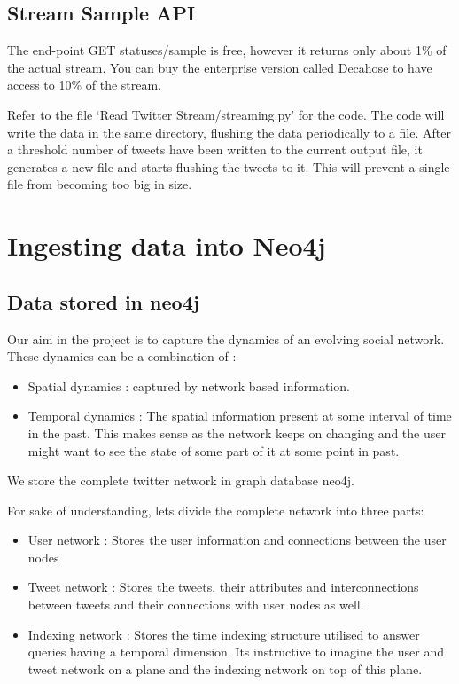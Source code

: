 \documentclass[letterpaper,10pt,english]{sphinxmanual}
\begin{document}
\section{Stream Sample API}
\label{\detokenize{twitter_stream:stream-sample-api}}
The end-point GET statuses/sample is free, however it returns only about 1\% of the actual stream. You can buy the enterprise version called Decahose to have access to 10\% of the stream.

Refer to the file ‘Read Twitter Stream/streaming.py’ for the code. The code will write the data in the same directory, flushing the data periodically to a file. After a threshold number of tweets have been written to the current output file, it generates a new file and starts flushing the tweets to it. This will prevent a single file from becoming too big in size.


\chapter{Ingesting data into Neo4j}
\label{\detokenize{neo4j_data_ingestion::doc}}\label{\detokenize{neo4j_data_ingestion:ingesting-data-into-neo4j}}

\section{Data stored in neo4j}
\label{\detokenize{neo4j_data_ingestion:data-stored-in-neo4j}}
Our aim in the project is to capture the dynamics of an evolving social network. These dynamics can be a combination of :
\begin{itemize}
\item {} 
Spatial dynamics : captured by network based information.

\item {} 
Temporal dynamics : The spatial information present at some interval of time in the past. This makes sense as the network keeps on changing and the user might want to see the state of some part of it at some point in past.

\end{itemize}

We store the complete twitter network in graph database neo4j.

For sake of understanding, lets divide the complete network into three parts:
\begin{itemize}
\item {} 
User network : Stores the user information and connections between the user nodes

\item {} 
Tweet network : Stores the tweets, their attributes and interconnections between tweets and their connections with user nodes as well.

\item {} 
Indexing network : Stores the time indexing structure utilised to answer queries having a temporal dimension. Its instructive to imagine the user and tweet network on a plane and the indexing network on top of this plane.

\end{itemize}
\end{document}

